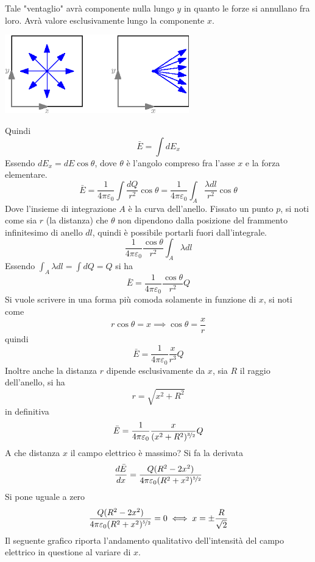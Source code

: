 \documentclass[10pt, letterpaper]{report}
\begin{document}
Tale "ventaglio" avrà componente nulla lungo $y$ in quanto le forze si annullano fra loro. Avrà valore esclusivamente lungo la componente $x$.\begin{center}
    \includegraphics[width=0.6\textwidth]{images/anello4.eps}
\end{center}
Quindi 
$$ \bar E = \int dE_x$$
Essendo $dE_x=dE\cos\theta$, dove $\theta$ è l'angolo compreso fra l'asse $x$ e la forza elementare.
$$ \bar E =  \frac{1}{4\pi\varepsilon_0}\int\frac{dQ}{r^2}\cos\theta=\frac{1}{4\pi\varepsilon_0}\int_A\frac{\lambda dl}{r^2}\cos\theta$$
Dove l'insieme di integrazione $A$ è la curva dell'anello. Fissato un punto $p$, si noti come sia $r$ (la distanza) che $\theta$ non dipendono dalla posizione del frammento infinitesimo di anello $dl$, quindi è possibile portarli fuori dall'integrale. 
$$ \frac{1}{4\pi\varepsilon_0}\frac{\cos\theta}{r^2}\int_A \lambda dl$$
Essendo $\int_A \lambda dl=\int dQ=Q$ si ha 
$$ \bar E = \frac{1}{4\pi\varepsilon_0}\frac{\cos\theta}{r^2}Q$$
Si vuole scrivere in una forma più comoda solamente in funzione di $x$, si noti come 
$$ r\cos\theta=x\implies \cos\theta =\frac{x}{r}$$
quindi 
$$ \bar E = \frac{1}{4\pi\varepsilon_0}\frac{x}{r^3}Q$$
Inoltre anche la distanza $r$ dipende esclusivamente da $x$, sia $R$ il raggio dell'anello, si ha 
$$ r=\sqrt{x^2+R^2}$$
in definitiva 
$$ \bar E = \frac{1}{4\pi\varepsilon_0}\frac{x}{(x^2+R^2)^{\nicefrac{3}{2}}}Q$$
A che distanza $x$ il campo elettrico è massimo? Si fa la derivata 
$$ \frac{d\bar E}{dx}=\frac{Q(R^2-2x^2)}{4\pi\varepsilon_0(R^2+x^2)^{\nicefrac{5}{2}}}$$
Si pone uguale a zero 
$$ \frac{Q(R^2-2x^2)}{4\pi\varepsilon_0(R^2+x^2)^{\nicefrac{5}{2}}}=0\iff x=\pm\frac{R}{\sqrt{2}}$$
Il seguente grafico riporta l'andamento qualitativo dell'intensità del campo elettrico in questione al variare di $x$.
\begin{center}
\end{center}
\end{document}
